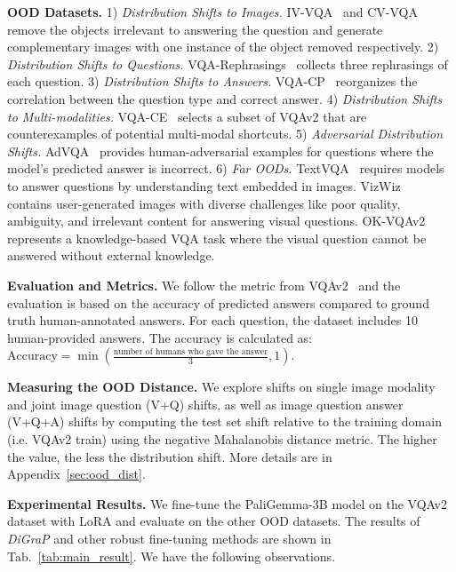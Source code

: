 \textbf{OOD Datasets.}
1) \textit{Distribution Shifts to Images.} IV-VQA~\citep{agarwal_towards_2020} and CV-VQA~\citep{agarwal_towards_2020} remove the objects irrelevant to answering the question and generate complementary images with one instance of the object removed respectively.
2) \textit{Distribution Shifts to Questions.} VQA-Rephrasings~\citep{shah_cycle-consistency_2019} collects three rephrasings of each question. 
3) \textit{Distribution Shifts to Answers.} VQA-CP~\citep{agrawal_dont_2018} reorganizes the correlation between the question type and correct answer.
4) \textit{Distribution Shifts to Multi-modalities.} VQA-CE~\citep{dancette_beyond_2021} selects a subset of VQAv2 that are counterexamples of potential multi-modal shortcuts.
5) \textit{Adversarial Distribution Shifts.} AdVQA~\citep{sheng_human-adversarial_2021} provides human-adversarial examples for questions where the model’s predicted answer is incorrect.
6) \textit{Far OODs.} TextVQA~\citep{singh_towards_2019} requires models to answer questions by understanding text embedded in images. VizWiz~\citep{bigham_vizwiz_nodate} contains user-generated images with diverse challenges like poor quality, ambiguity, and irrelevant content for answering visual questions. OK-VQAv2~\citep{reichman_outside_2023} represents a knowledge-based VQA task where the visual question cannot be answered without external knowledge.

\noindent \textbf{Evaluation and Metrics.} We follow the metric from VQAv2~\citep{goyal_making_2017} and the evaluation is based on the accuracy of predicted answers compared to ground truth human-annotated answers. For each question, the dataset includes 10 human-provided answers. The accuracy is calculated as: $\text{Accuracy} = \min\left(\frac{\text{number of humans who gave the answer}}{3}, 1\right)
$.

\noindent \textbf{Measuring the OOD Distance.} We explore shifts on single image modality and joint image question (V+Q) shifts, as well as image question answer (V+Q+A) shifts by computing
the test set shift relative to the training domain (i.e. VQAv2 train) using the negative Mahalanobis distance metric. The higher the value, the less the distribution shift. More details are in Appendix~\ref{sec:ood_dist}.

\noindent \textbf{Experimental Results.} We fine-tune the PaliGemma-3B model on the VQAv2 dataset with LoRA and evaluate on the other OOD datasets. The results of \emph{DiGraP} and other robust fine-tuning methods are shown in Tab.~\ref{tab:main_result}. We have the following observations.

